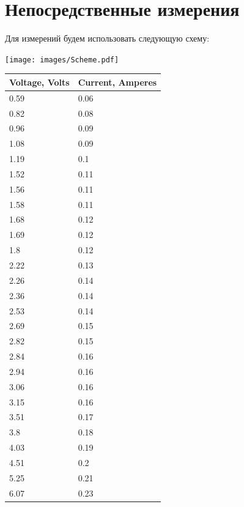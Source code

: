 \documentclass[12pt]{article}
\begin{document}
    \section{Непосредственные измерения}

    Для измерений будем использовать следующую схему:

    {
        \centering
        \texttt{[image: images/Scheme.pdf]}
        \label{fig:scheme}
    }

    {
        \centering
        \begin{tabular}{|l|l|}
            \hline
            Voltage, Volts & Current, Amperes \\ \hline
            0.59    & 0.06    \\ \hline
            0.82    & 0.08    \\ \hline
            0.96    & 0.09    \\ \hline
            1.08    & 0.09    \\ \hline
            1.19    & 0.1     \\ \hline
            1.52    & 0.11    \\ \hline
            1.56    & 0.11    \\ \hline
            1.58    & 0.11    \\ \hline
            1.68    & 0.12    \\ \hline
            1.69    & 0.12    \\ \hline
            1.8     & 0.12    \\ \hline
            2.22    & 0.13    \\ \hline
            2.26    & 0.14    \\ \hline
            2.36    & 0.14    \\ \hline
            2.53    & 0.14    \\ \hline
            2.69    & 0.15    \\ \hline
            2.82    & 0.15    \\ \hline
            2.84    & 0.16    \\ \hline
            2.94    & 0.16    \\ \hline
            3.06    & 0.16    \\ \hline
            3.15    & 0.16    \\ \hline
            3.51    & 0.17    \\ \hline
            3.8     & 0.18    \\ \hline
            4.03    & 0.19    \\ \hline
            4.51    & 0.2     \\ \hline
            5.25    & 0.21    \\ \hline
            6.07    & 0.23    \\ \hline
        \end{tabular}
    }
\end{document}
